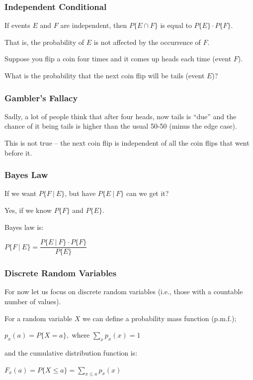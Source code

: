 \begin{frame}
\frametitle{Independent Conditional}

If events $E$ and $F$ are independent, then $P\{E \cap F\}$ is equal to $P\{E\} \cdot P\{F\}$. 

That is, the probability of $E$ is not affected by the occurrence of $F$. 

Suppose you flip a coin four times and it comes up heads each time (event $F$). 

What is the probability that the next coin flip will be tails (event $E$)?

\end{frame}



\begin{frame}
\frametitle{Gambler's Fallacy}

Sadly, a lot of people think that after four heads, now tails is ``due'' and the chance of it being tails is higher than the usual 50-50 (minus the edge case). 

This is not true -- the next coin flip is independent of all the coin flips that went before it.

\end{frame}



\begin{frame}
\frametitle{Bayes Law}

If we want $P\{ F~|~E \}$, but have $P\{ E~|~F \}$ can we get it? 

Yes, if we know $P\{F\}$ and $P\{E\}$. 

Bayes law is:

\begin{center}
	$P\{F~|~E\} = \dfrac{P\{E~|~F\} \cdot P\{F\}}{P\{E\}}$
\end{center}


\end{frame}



\begin{frame}
\frametitle{Discrete Random Variables}


For now let us focus on discrete random variables (i.e., those with a countable number of values). 

For a random variable $X$ we can define a probability mass function (p.m.f.);

\begin{center}
	$p_{x}(a) = P \{ X = a \},$ where $\sum\limits_{x}^{~} p_{x}(x) = 1$
\end{center}
	and the cumulative distribution function is:
\begin{center}
	$F_{x}(a) = P \{ X \leq a \} = \sum\limits_{x \leq a} p_{x}(x)$
\end{center}


\end{frame}



